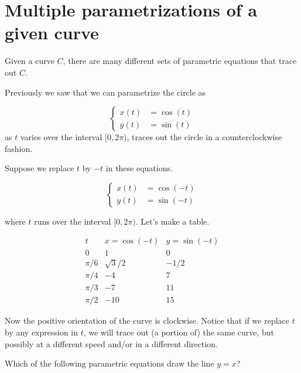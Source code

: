 \documentclass{ximera}
\begin{document}
\section{Multiple parametrizations of a given curve}

Given a curve $C$, there are many different sets of parametric equations that trace out $C$.


Previously we saw that we can parametrize the circle as

\[
\begin{cases}
x(t)&=\cos(t) \\
y(t)&=\sin(t)
\end{cases}
\]
as $t$ varies over the interval $[0, 2\pi)$, traces out the circle in a counterclockwise fashion.

Suppose we replace $t$ by $-t$ in these equations.

\[
\begin{cases}
x(t)&=\cos(-t) \\
y(t)&=\sin(-t)
\end{cases}
\]

where $t$ runs over the interval $[0, 2\pi)$. Let's make a table.

\[
\begin{array}{c|c|c}
  t  & x =\cos(-t) & y = \sin(-t)\\\hline
  0  & 1  & 0 \\
  \pi/6  & \sqrt{3}/2 & -1/2 \\
  \pi/4  & -4 & 7 \\
  \pi/3  & -7 & 11\\
  \pi/2  & -10& 15
\end{array}
\]

Now the positive orientation of the curve is clockwise.  Notice that if we replace $t$ by any expression in $t$, we will trace out (a portion of) the same curve, but possibly at a different speed and/or in a different direction.

\begin{question}
  Which of the following parametric equations draw the line $y=x$?
  \begin{selectAll}
  \end{selectAll}
\end{question}
\end{document}
